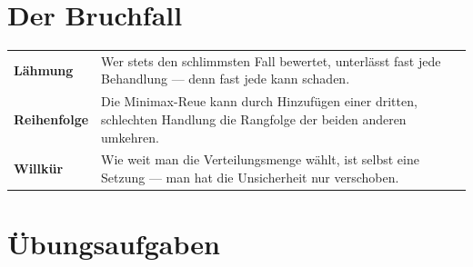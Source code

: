 \section{Der Bruchfall}

\begin{warnung}
\begin{center}
{\small
\renewcommand{\arraystretch}{1.52}
\begin{tabular}{@{}P{2.6cm}P{6.0cm}@{}}
\toprule
\textbf{Lähmung} & Wer stets den schlimmsten Fall bewertet, unterlässt fast jede Behandlung --- denn fast jede kann schaden.\\
\textbf{Reihenfolge} & Die Minimax-Reue kann durch Hinzufügen einer dritten, schlechten Handlung die Rangfolge der beiden anderen umkehren.\\
\textbf{Willkür} & Wie weit man die Verteilungsmenge wählt, ist selbst eine Setzung --- man hat die Unsicherheit nur verschoben.\\
\bottomrule
\end{tabular}}
\end{center}

\begin{center}
\begin{minipage}{0.88\textwidth}
\end{minipage}
\end{center}
\end{warnung}

\section{Übungsaufgaben}


